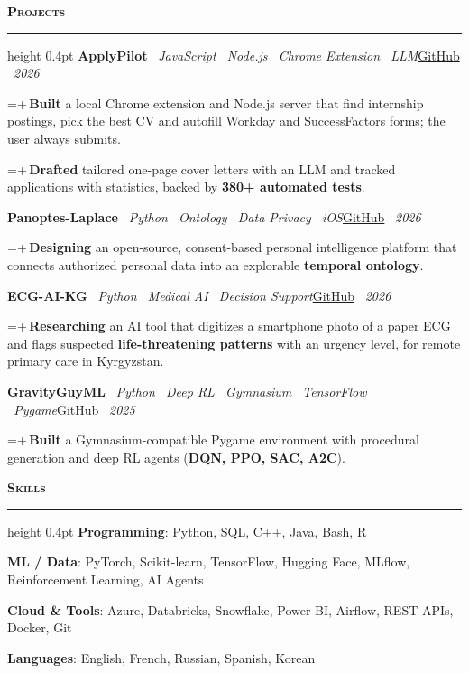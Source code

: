 \documentclass[letterpaper,11pt]{article}
\newcommand{\sep}{\textbar\ }
\newlength{\cvindent}\setlength{\cvindent}{7pt}
\newcommand{\cvsection}[1]{\vspace{9pt}\noindent\textbf{\textsc{#1}}\par\nointerlineskip\vspace{3pt}\hrule height 0.4pt\vspace{7pt}}
\newcommand{\cvrow}[2]{\noindent\hspace{\cvindent}#1\hfill #2\par}
\newlength{\cvbw}
\newcommand{\cvb}[1]{{\fontsize{9.5}{11.4}\selectfont\settowidth{\cvbw}{\textbullet\,}\hangindent=\dimexpr2\cvindent+\cvbw\relax\hangafter=1\noindent\hspace{2\cvindent}\textbullet\,#1\par}}
\newcommand{\cvgap}{\vspace{4pt}}
\begin{document}
\cvsection{Projects}
\cvrow{\textbf{ApplyPilot} \sep \textit{JavaScript \textemdash\ Node.js \textemdash\ Chrome Extension \textemdash\ LLM}}{\href{https://github.com/Mbaka11/ApplyPilot}{GitHub} \sep \textit{2026}}
\cvb{\textbf{Built} a local Chrome extension and Node.js server that find internship postings, pick the best CV and autofill Workday and SuccessFactors forms; the user always submits.}
\cvb{\textbf{Drafted} tailored one-page cover letters with an LLM and tracked applications with statistics, backed by \textbf{380+ automated tests}.}
\cvgap
\cvrow{\textbf{Panoptes-Laplace} \sep \textit{Python \textemdash\ Ontology \textemdash\ Data Privacy \textemdash\ iOS}}{\href{https://github.com/Mbaka11/Panoptes-Laplace}{GitHub} \sep \textit{2026}}
\cvb{\textbf{Designing} an open-source, consent-based personal intelligence platform that connects authorized personal data into an explorable \textbf{temporal ontology}.}
\cvgap
\cvrow{\textbf{ECG-AI-KG} \sep \textit{Python \textemdash\ Medical AI \textemdash\ Decision Support}}{\href{https://github.com/Mbaka11/ECG-AI-KG}{GitHub} \sep \textit{2026}}
\cvb{\textbf{Researching} an AI tool that digitizes a smartphone photo of a paper ECG and flags suspected \textbf{life-threatening patterns} with an urgency level, for remote primary care in Kyrgyzstan.}
\cvgap
\cvrow{\textbf{GravityGuyML} \sep \textit{Python \textemdash\ Deep RL \textemdash\ Gymnasium \textemdash\ TensorFlow \textemdash\ Pygame}}{\href{https://github.com/Mbaka11/Gravity-Guy-ML}{GitHub} \sep \textit{2025}}
\cvb{\textbf{Built} a Gymnasium-compatible Pygame environment with procedural generation and deep RL agents (\textbf{DQN, PPO, SAC, A2C}).}
\cvgap

\cvsection{Skills}
\hspace{\cvindent}\textbf{Programming}: Python, SQL, C++, Java, Bash, R\par
\hspace{\cvindent}\textbf{ML / Data}: PyTorch, Scikit-learn, TensorFlow, Hugging Face, MLflow, Reinforcement Learning, AI Agents\par
\hspace{\cvindent}\textbf{Cloud \& Tools}: Azure, Databricks, Snowflake, Power BI, Airflow, REST APIs, Docker, Git\par
\hspace{\cvindent}\textbf{Languages}: English, French, Russian, Spanish, Korean\par
\end{document}
